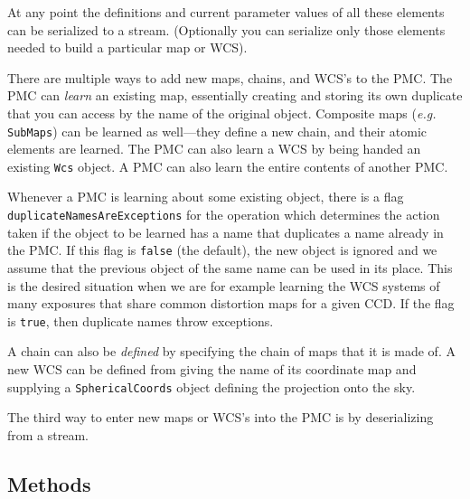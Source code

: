 \documentclass[11pt,preprint,flushrt]{aastex}
\begin{document}
At any point the definitions and current parameter values of all these elements can be serialized to a stream.  (Optionally you can serialize only those elements needed to build a particular map or WCS).  

There are multiple ways to add new maps, chains, and WCS's to the PMC.  
The PMC can {\em learn} an existing map, essentially creating and storing its own duplicate that you can access by the name of the original object.  Composite maps ({\it e.g.\/} {\tt SubMaps}) can be learned as well---they define a new chain, and their atomic elements are learned.  The PMC can also learn a WCS by being handed an existing {\tt Wcs} object.  A PMC can also learn the entire contents of another PMC.

Whenever a PMC is learning about some existing object, there is a flag {\tt duplicateNamesAreExceptions} for the operation which determines the action taken if the object to be learned has a name that duplicates a name already in the PMC.
If this flag is {\tt false} (the default), the new object is ignored and we assume that the previous object of the same name can be used in its place.  This is the desired situation when we are for example learning the WCS systems of many exposures that share common distortion maps for a given CCD.  If the flag is {\tt true}, then duplicate names throw exceptions.

A chain can also be {\em defined} by specifying the chain of maps that it is made of.  A new WCS can be defined from giving the name of its coordinate map and supplying a {\tt SphericalCoords} object defining the projection onto the sky.

The third way to enter new maps or WCS's into the PMC is by deserializing from a stream.

\subsection{Methods}
\end{document}

